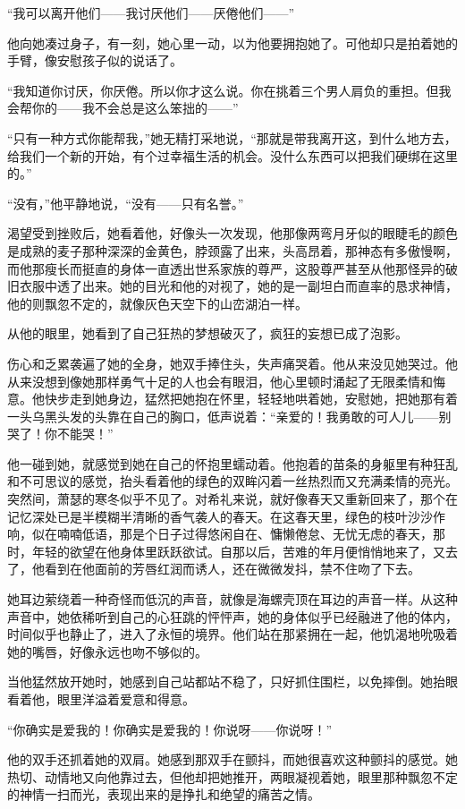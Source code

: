 \par “我可以离开他们——我讨厌他们——厌倦他们——”
\par 他向她凑过身子，有一刻，她心里一动，以为他要拥抱她了。可他却只是拍着她的手臂，像安慰孩子似的说话了。
\par “我知道你讨厌，你厌倦。所以你才这么说。你在挑着三个男人肩负的重担。但我会帮你的——我不会总是这么笨拙的——”
\par “只有一种方式你能帮我，”她无精打采地说，“那就是带我离开这，到什么地方去，给我们一个新的开始，有个过幸福生活的机会。没什么东西可以把我们硬绑在这里的。”
\par “没有，”他平静地说，“没有——只有名誉。”
\par 渴望受到挫败后，她看着他，好像头一次发现，他那像两弯月牙似的眼睫毛的颜色是成熟的麦子那种深深的金黄色，脖颈露了出来，头高昂着，那神态有多傲慢啊，而他那瘦长而挺直的身体一直透出世系家族的尊严，这股尊严甚至从他那怪异的破旧衣服中透了出来。她的目光和他的对视了，她的是一副坦白而直率的恳求神情，他的则飘忽不定的，就像灰色天空下的山峦湖泊一样。
\par 从他的眼里，她看到了自己狂热的梦想破灭了，疯狂的妄想已成了泡影。
\par 伤心和乏累袭遍了她的全身，她双手捧住头，失声痛哭着。他从来没见她哭过。他从来没想到像她那样勇气十足的人也会有眼泪，他心里顿时涌起了无限柔情和悔意。他快步走到她身边，猛然把她抱在怀里，轻轻地哄着她，安慰她，把她那有着一头乌黑头发的头靠在自己的胸口，低声说着：“亲爱的！我勇敢的可人儿——别哭了！你不能哭！”
\par 他一碰到她，就感觉到她在自己的怀抱里蠕动着。他抱着的苗条的身躯里有种狂乱和不可思议的感觉，抬头看着他的绿色的双眸闪着一丝热烈而又充满柔情的亮光。突然间，萧瑟的寒冬似乎不见了。对希礼来说，就好像春天又重新回来了，那个在记忆深处已是半模糊半清晰的香气袭人的春天。在这春天里，绿色的枝叶沙沙作响，似在喃喃低语，那是个日子过得悠闲自在、慵懒倦怠、无忧无虑的春天，那时，年轻的欲望在他身体里跃跃欲试。自那以后，苦难的年月便悄悄地来了，又去了，他看到在他面前的芳唇红润而诱人，还在微微发抖，禁不住吻了下去。
\par 她耳边萦绕着一种奇怪而低沉的声音，就像是海螺壳顶在耳边的声音一样。从这种声音中，她依稀听到自己的心狂跳的怦怦声，她的身体似乎已经融进了他的体内，时间似乎也静止了，进入了永恒的境界。他们站在那紧拥在一起，他饥渴地吮吸着她的嘴唇，好像永远也吻不够似的。
\par 当他猛然放开她时，她感到自己站都站不稳了，只好抓住围栏，以免摔倒。她抬眼看着他，眼里洋溢着爱意和得意。
\par “你确实是爱我的！你确实是爱我的！你说呀——你说呀！”
\par 他的双手还抓着她的双肩。她感到那双手在颤抖，而她很喜欢这种颤抖的感觉。她热切、动情地又向他靠过去，但他却把她推开，两眼凝视着她，眼里那种飘忽不定的神情一扫而光，表现出来的是挣扎和绝望的痛苦之情。
